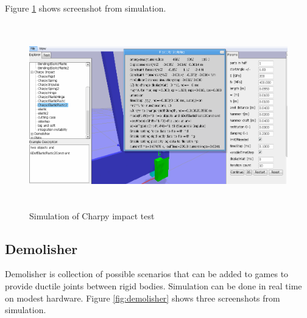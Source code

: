 Figure \ref{fig:charpy} shows screenshot from simulation.
\begin{figure}[htb!]
\centering
\includegraphics[height=8cm]{figs/article-charpy}
\caption{Simulation of Charpy impact test}
\label{fig:charpy}
\end{figure}


\subsection{Demolisher}
Demolisher is  collection of possible scenarios that can be added to games to provide ductile joints between
rigid bodies.  Simulation can be done in real time on modest hardware. 
Figure \ref{fig:demolisher} shows three screenshots from simulation.

